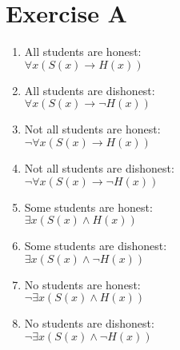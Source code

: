\section{Exercise A}

\renewcommand{\labelenumi}{(\alph{enumi})}
\begin{enumerate}
    \item All students are honest: \\
    $\forall x(S(x) \to H(x))$ %
   
    \item All students are dishonest: \\
    $\forall x(S(x) \to \neg H(x))$ %
   
    \item Not all students are honest: \\
    $\neg \forall x(S(x) \to H(x))$ %
   
    \item Not all students are dishonest: \\
    $\neg \forall x(S(x) \to \neg H(x))$ %
   
    \item Some students are honest: \\
    $\exists x(S(x) \land H(x))$ %
    
    \item Some students are dishonest: \\
    $\exists x(S(x) \land \neg H(x))$ %
   
    \item No students are honest: \\
    $\neg \exists x(S(x) \land H(x))$ %
    
    \item No students are dishonest: \\
    $\neg \exists x(S(x) \land \neg H(x))$ %
\end{enumerate}